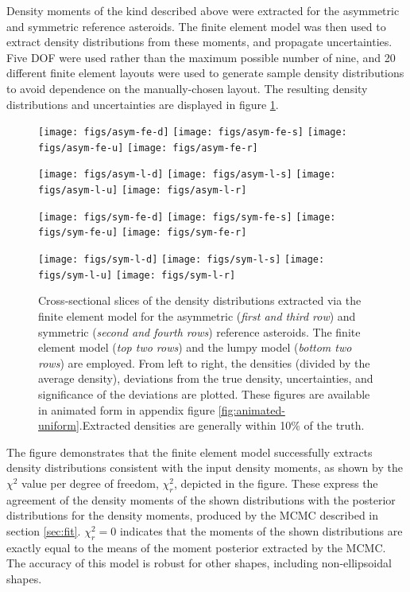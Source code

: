 \documentclass[fleqn,usenatbib]{mnras}
\begin{document}
Density moments of the kind described above were extracted for the asymmetric and symmetric reference asteroids. The finite element model was then used to extract density distributions from these moments, and propagate uncertainties. Five DOF were used rather than the maximum possible number of nine, and 20 different finite element layouts were used to generate sample density distributions to avoid dependence on the manually-chosen layout. The resulting density distributions and uncertainties are displayed in figure \ref{fig:den-uniform}.
\begin{figure}
  \texttt{[image: figs/asym-fe-d]}\hfill
  \texttt{[image: figs/asym-fe-s]}\hfill
  \texttt{[image: figs/asym-fe-u]}\hfill
  \texttt{[image: figs/asym-fe-r]}

  \texttt{[image: figs/asym-l-d]}\hfill
  \texttt{[image: figs/asym-l-s]}\hfill
  \texttt{[image: figs/asym-l-u]}\hfill
  \texttt{[image: figs/asym-l-r]}

  \texttt{[image: figs/sym-fe-d]}\hfill
  \texttt{[image: figs/sym-fe-s]}\hfill
  \texttt{[image: figs/sym-fe-u]}\hfill
  \texttt{[image: figs/sym-fe-r]}

  \texttt{[image: figs/sym-l-d]}\hfill
  \texttt{[image: figs/sym-l-s]}\hfill
  \texttt{[image: figs/sym-l-u]}\hfill
  \texttt{[image: figs/sym-l-r]}

  \caption{Cross-sectional slices of the density distributions extracted via the finite element model for the asymmetric (\textit{first and third row}) and symmetric (\textit{second and fourth rows}) reference asteroids. The finite element model (\textit{top two rows}) and the lumpy model (\textit{bottom two rows}) are employed. From left to right, the densities (divided by the average density), deviations from the true density, uncertainties, and significance of the deviations are plotted. These figures are available in animated form in appendix figure \ref{fig:animated-uniform}.Extracted densities are generally within 10\% of the truth.}
  \label{fig:den-uniform}
\end{figure}

The figure demonstrates that the finite element model successfully extracts density distributions consistent with the input density moments, as shown by the $\chi^2$ value per degree of freedom, $\chi^2_r$, depicted in the figure. These express the agreement of the density moments of the shown distributions with the posterior distributions for the density moments, produced by the MCMC described in section \ref{sec:fit}. $\chi^2_r = 0$ indicates that the moments of the shown distributions are exactly equal to the means of the moment posterior extracted by the MCMC. The accuracy of this model is robust for other shapes, including non-ellipsoidal shapes.
\end{document}
